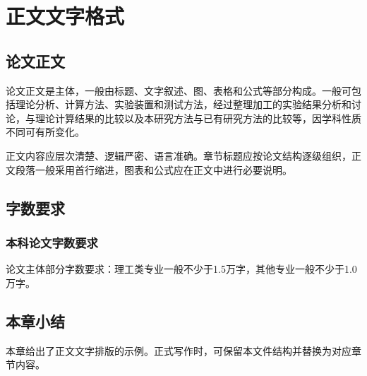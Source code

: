 
\section{正文文字格式}

\subsection{论文正文}
\thesisbodyfont
论文正文是主体，一般由标题、文字叙述、图、表格和公式等部分构成。一般可包括理论分析、计算方法、实验装置和测试方法，经过整理加工的实验结果分析和讨论，与理论计算结果的比较以及本研究方法与已有研究方法的比较等，因学科性质不同可有所变化。\par
正文内容应层次清楚、逻辑严密、语言准确。章节标题应按论文结构逐级组织，正文段落一般采用首行缩进，图表和公式应在正文中进行必要说明。

\subsection{字数要求}
\subsubsection{本科论文字数要求}
\thesisbodyfont
论文主体部分字数要求：理工类专业一般不少于1.5万字，其他专业一般不少于1.0万字。

\subsection{本章小结}
\thesisbodyfont
本章给出了正文文字排版的示例。正式写作时，可保留本文件结构并替换为对应章节内容。
